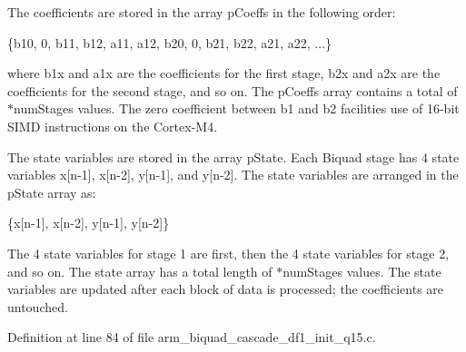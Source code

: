 \begin{DoxyParagraph}{}
The coefficients are stored in the array {\ttfamily p\-Coeffs} in the following order\-: 
\begin{DoxyPre}    
    \{b10, 0, b11, b12, a11, a12, b20, 0, b21, b22, a21, a22, ...\}    
\end{DoxyPre}
 where {\ttfamily b1x} and {\ttfamily a1x} are the coefficients for the first stage, {\ttfamily b2x} and {\ttfamily a2x} are the coefficients for the second stage, and so on. The {\ttfamily p\-Coeffs} array contains a total of {$\ast$num\-Stages} values. The zero coefficient between {\ttfamily b1} and {\ttfamily b2} facilities use of 16-\/bit S\-I\-M\-D instructions on the Cortex-\/\-M4.
\end{DoxyParagraph}
\begin{DoxyParagraph}{}
The state variables are stored in the array {\ttfamily p\-State}. Each Biquad stage has 4 state variables {\ttfamily x\mbox{[}n-\/1\mbox{]}, x\mbox{[}n-\/2\mbox{]}, y\mbox{[}n-\/1\mbox{]},} and {\ttfamily y\mbox{[}n-\/2\mbox{]}}. The state variables are arranged in the {\ttfamily p\-State} array as\-: 
\begin{DoxyPre}    
    \{x[n-1], x[n-2], y[n-1], y[n-2]\}    
\end{DoxyPre}
 The 4 state variables for stage 1 are first, then the 4 state variables for stage 2, and so on. The state array has a total length of {$\ast$num\-Stages} values. The state variables are updated after each block of data is processed; the coefficients are untouched. 
\end{DoxyParagraph}


Definition at line 84 of file arm\-\_\-biquad\-\_\-cascade\-\_\-df1\-\_\-init\-\_\-q15.\-c.

